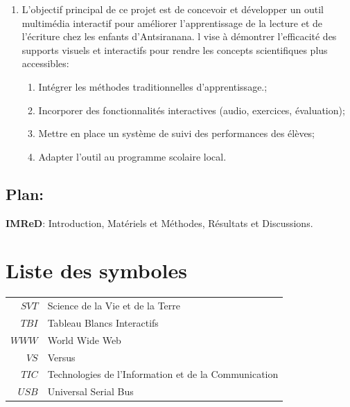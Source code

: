 \documentclass[a4paper,oneside,12pt]{book}
\begin{document}
\begin{enumerate}
	\item [$\Rightarrow$]L’objectif principal de ce projet est de concevoir et développer un outil multimédia interactif pour améliorer l’apprentissage de la lecture et de l’écriture chez les enfants d’Antsiranana. l vise à démontrer l’efficacité des supports visuels et interactifs pour rendre les concepts scientifiques plus accessibles:
	\begin{enumerate}
		\item [$*$]Intégrer les méthodes traditionnelles d’apprentissage.;
		\item [$*$]Incorporer des fonctionnalités interactives (audio, exercices, évaluation);
		\item [$*$]Mettre en place un système de suivi des performances des élèves;
		\item [$*$]Adapter l’outil au programme scolaire local.
	\end{enumerate}
	
\end{enumerate}
\section*{Plan:}
\textbf{IMReD}: Introduction, Matériels et Méthodes, Résultats et Discussions.\\
\renewcommand{\contentsname}{Table des matières}
\tableofcontents
\listoftables
{}
\listoffigures
{}
\chapter*{Liste des symboles}
\begin{tabular}{r|l}
	 
	 $SVT$	&Science de la Vie et de la Terre\\ 
	 $TBI$ & Tableau Blancs Interactifs \\
	 $WWW$&	World Wide Web\\
	  $VS$&	Versus\\
	 $TIC$& Technologies de l'Information et de la Communication\\
	 $USB$&  Universal Serial Bus\\

	 
\end{tabular}


\end{document}
